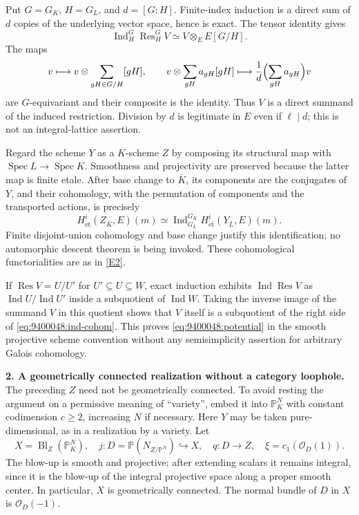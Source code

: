 \documentclass[11pt,a4paper]{article}
\newcommand{\PP}{\mathbb P}
\newcommand{\eref}[2]{\hyperlink{extra:#1:#2}{[E#2]}}
\numberwithin{equation}{section}
\begin{document}
Put $G=G_K$, $H=G_L$, and $d=[G:H]$. Finite-index induction is a direct sum
of $d$ copies of the underlying vector space, hence is exact. The tensor
identity gives
\[
 \operatorname{Ind}_H^G\operatorname{Res}_H^G V
       \simeq V\otimes_E E[G/H].
\]
The maps
\[
 v\longmapsto v\otimes\sum_{gH\in G/H}[gH],\qquad
 v\otimes\sum_{gH}a_{gH}[gH]\longmapsto
          \frac{1}{d}\Bigl(\sum_{gH}a_{gH}\Bigr)v
\]
are $G$-equivariant and their composite is the identity. Thus $V$ is a
direct summand of the induced restriction. Division by $d$ is legitimate in
$E$ even if $\ell\mid d$; this is not an integral-lattice assertion.

Regard the scheme $Y$ as a $K$-scheme $Z$ by composing its structural map
with $\operatorname{Spec}L\to\operatorname{Spec}K$. Smoothness and
projectivity are preserved because the latter map is finite etale.
After base change to $\bar K$, its components are the conjugates of $Y$,
and their cohomology, with the permutation of components and the transported
actions, is precisely
\begin{equation}\label{eq:9400048:ind-cohom}
 H^i_{\mathrm{\acute et}}(Z_{\bar K},E)(m)
 \simeq \operatorname{Ind}_{G_L}^{G_K}
       H^i_{\mathrm{\acute et}}(Y_{\bar L},E)(m).
\end{equation}
Finite disjoint-union cohomology and base change justify this identification;
no automorphic descent theorem is being invoked. These cohomological
functorialities are as in \eref{9400048}{2}.

If $\operatorname{Res}V=U/U'$ for $U'\subseteq U\subseteq W$, exact
induction exhibits $\operatorname{Ind}\operatorname{Res}V$ as
$\operatorname{Ind}U/\operatorname{Ind}U'$ inside a subquotient of
$\operatorname{Ind}W$. Taking the inverse image of the summand $V$ in this
quotient shows that $V$ itself is a subquotient of the right side of
\eqref{eq:9400048:ind-cohom}. This proves \eqref{eq:9400048:potential} in the smooth
projective scheme convention without any semisimplicity assertion for
arbitrary Galois cohomology.

\textbf{2. A geometrically connected realization without a category loophole.}
The preceding $Z$ need not be geometrically connected. To avoid resting the
argument on a permissive meaning of ``variety'', embed it into $\PP^N_K$
with constant codimension $c\ge2$, increasing $N$ if necessary. Here $Y$
may be taken pure-dimensional, as in a realization by a variety. Let
\[
 X=\operatorname{Bl}_{Z}(\PP^N_K),\quad
 j:D=\PP(N_{Z/\PP^N})\hookrightarrow X,\quad q:D\to Z,
 \quad \xi=c_1(\mathcal O_D(1)).
\]
The blow-up is smooth and projective; after extending scalars it remains
integral, since it is the blow-up of the integral projective space along a
proper smooth center. In particular, $X$ is geometrically connected.
The normal bundle of $D$ in $X$ is $\mathcal O_D(-1)$.
\end{document}
